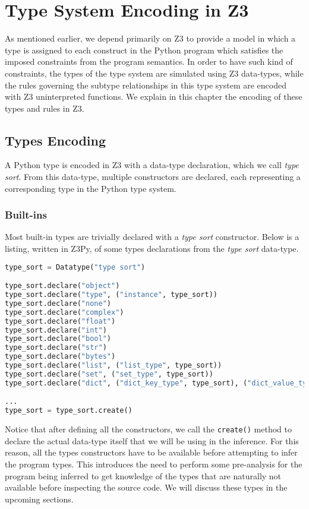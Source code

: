 
\chapter{Type System Encoding in Z3}\label{chapter:ts}
As mentioned earlier, we depend primarily on Z3 to provide a model in which a type is assigned to each construct in the Python program which satisfies the imposed constraints from the program semantics. In order to have such kind of constraints, the types of the type system are simulated using Z3 data-types, while the rules governing the subtype relationships in this type system are encoded with Z3 uninterpreted functions. We explain in this chapter the encoding of these types and rules in Z3.
\section{Types Encoding}
A Python type is encoded in Z3 with a data-type declaration, which we call \textit{type sort}. From this data-type, multiple constructors are declared, each representing a corresponding type in the Python type system.\\

\subsection{Built-ins}
Most built-in types are trivially declared with a \textit{type sort} constructor. Below is a listing, written in Z3Py, of some types declarations from the \textit{type sort} data-type.

\begin{lstlisting}[language=python]
type_sort = Datatype("type sort")

type_sort.declare("object")
type_sort.declare("type", ("instance", type_sort))
type_sort.declare("none")
type_sort.declare("complex")
type_sort.declare("float")
type_sort.declare("int")
type_sort.declare("bool")
type_sort.declare("str")
type_sort.declare("bytes")
type_sort.declare("list", ("list_type", type_sort))
type_sort.declare("set", ("set_type", type_sort))
type_sort.declare("dict", ("dict_key_type", type_sort), ("dict_value_type", type_sort))

...
type_sort = type_sort.create()
\end{lstlisting}

Notice that after defining all the constructors, we call the \lstinline|create()| method to declare the actual data-type itself that we will be using in the inference. For this reason, all the types constructors have to be available before attempting to infer the program types. This introduces the need to perform some pre-analysis for the program being inferred to get knowledge of the types that are naturally not available before inspecting the source code. We will discuss these types in the upcoming sections.

